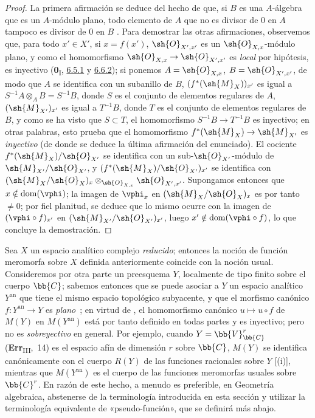 \begin{proof}
La primera afirmación se deduce del hecho de que, si $B$ es una $A$-álgebra que es un $A$-módulo plano, todo elemento de $A$ que no es divisor de $0$ en $A$ tampoco es divisor de $0$ en $B$ .
Para demostrar las otras afirmaciones, observemos que, para todo $x'\in X'$, si $x=f(x')$, $\sh{O}_{X',x'}$ es un $\sh{O}_{X,x}$-módulo plano, y como el homomorfismo $\sh{O}_{X,x}\to\sh{O}_{X',x'}$ es \emph{local} por hipótesis, es inyectivo (\textbf{0}\textsubscript{I}, \hyperref[0.6.5.1]{6.5.1} y \hyperref[0.6.6.2]{6.6.2}); si ponemos $A=\sh{O}_{X,x}$, $B=\sh{O}_{X',x'}$, de modo que $A$ se identifica con un subanillo de $B$, $(f^*(\sh{M}_X))_{x'}$ es igual a $S^{-1}A\otimes_A B=S^{-1}B$, donde $S$ es el conjunto de elementos regulares de $A$, $(\sh{M}_{X'})_{x'}$ es igual a $T^{-1}B$, donde $T$ es el conjunto
de elementos regulares de $B$, y como se ha visto que $S\subset T$, el homomorfismo $S^{-1}B\to T^{-1}B$ es inyectivo; en otras palabras, esto prueba que el homomorfismo  $f^*(\sh{M}_X)\to\sh{M}_{X'}$ es \emph{inyectivo} (de donde se deduce la última afirmación del enunciado).
El cociente $f^*(\sh{M}_X)/\sh{O}_{X'}$ se identifica con un sub-$\sh{O}_{X'}$-módulo de $\sh{M}_{X'}/\sh{O}_{X'}$, y $(f^*(\sh{M}_X)/\sh{O}_{X'})_{x'}$ se identifica con $(\sh{M}_X/\sh{O}_X)_x\otimes_{\sh{O}_{X,x}}\sh{O}_{X',x'}$.
Supongamos entonces que $x\notin\operatorname{dom}(\vphi)$; la imagen de $\vphi_x$ en $(\sh{M}_X/\sh{O}_X)_x$ es por tanto $\neq0$; por fiel planitud, se deduce que lo mismo ocurre con la imagen de $(\vphi\circ f)_{x'}$ en $(\sh{M}_{X'}/\sh{O}_{X'})_{x'}$, luego $x'\notin\operatorname{dom}(\vphi\circ f)$, lo que concluye la demostración.
\end{proof}

\begin{remark}[20.1.13]
\label{IV.20.1.13}
Sea $X$ un espacio analítico complejo \emph{reducido}; entonces la noción de función meromorfa sobre $X$ definida anteriormente coincide con la noción usual.
Consideremos por otra parte un preesquema $Y$, localmente de tipo finito sobre el cuerpo $\bb{C}$; sabemos entonces que se puede asociar a $Y$ un espacio analítico $Y^\mathrm{an}$ que tiene el mismo espacio topológico subyacente, y que el morfismo canónico $f:Y^\mathrm{an}\to Y$ es \emph{plano}~\cite{IV-37}; en virtud de , el homomorfismo canónico $u\mapsto u\circ f$ de $M(Y)$ en $M(Y^\mathrm{an})$ está por tanto definido en todas partes y es inyectivo; pero no es \emph{sobreyectivo} en general.
Por ejemplo, cuando $Y=\bb{V}_{\bb{C}}^r$ (\textbf{Err}\textsubscript{III},~14) es el espacio afín de dimensión $r$ sobre $\bb{C}$, $M(Y)$ se identifica canónicamente con el cuerpo $R(Y)$ de las funciones racionales sobre $Y$ [(i)], mientras que $M(Y^\mathrm{an})$ es el cuerpo de las funciones meromorfas usuales sobre $\bb{C}^r$.
En razón de este hecho, a menudo es preferible, en Geometría algebraica, abstenerse de la terminología introducida en esta sección y utilizar la terminología equivalente de «pseudo-función», que se definirá más abajo.
\end{remark}
